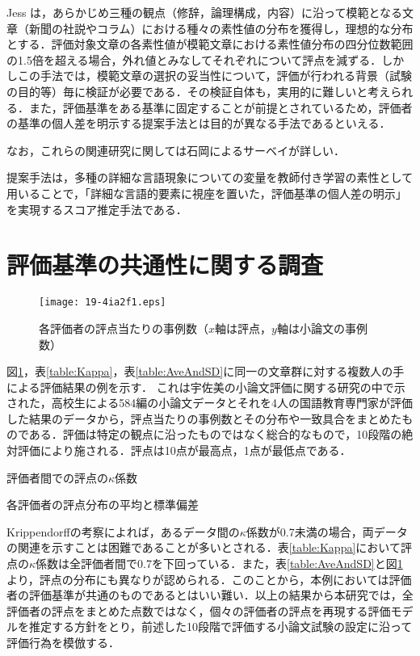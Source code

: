 \documentclass[japanese]{jnlp_1.5}
\begin{document}
Jess \cite{IshiokaKameda2006}は，あらかじめ三種の観点（修辞，論理構成，内容）に沿って模範となる文章（新聞の社説やコラム）における種々の素性値の分布を獲得し，理想的な分布とする．評価対象文章の各素性値が模範文章における素性値分布の四分位数範囲の1.5倍を超える場合，外れ値とみなしてそれぞれについて評点を減ずる．しかしこの手法では，模範文章の選択の妥当性について，評価が行われる背景（試験の目的等）毎に検証が必要である．その検証自体も，実用的に難しいと考えられる．また，評価基準をある基準に固定することが前提とされているため，評価者の基準の個人差を明示する提案手法とは目的が異なる手法であるといえる．

なお，これらの関連研究に関しては石岡によるサーベイ\cite{Ishioka2008a}が詳しい．

提案手法は，多種の詳細な言語現象についての変量を教師付き学習の素性として用いることで，「詳細な言語的要素に視座を置いた，評価基準の個人差の明示」を実現するスコア推定手法である．



\section{評価基準の共通性に関する調査}

\begin{figure}[b]
	\begin{center}
	\texttt{[image: 19-4ia2f1.eps]}
	\end{center}
	\caption{各評価者の評点当たりの事例数（$x$軸は評点，$y$軸は小論文の事例数）}
	\label{fig:1}
\end{figure}

図\ref{fig:1}，表\ref{table:Kappa}，表\ref{table:AveAndSD}に同一の文章群に対する複数人の手による評価結果の例を示す．
これは宇佐美の小論文評価に関する研究\cite{Usami2011}の中で示された，高校生による584編の小論文データとそれを4人の国語教育専門家が評価した結果のデータから，評点当たりの事例数とその分布や一致具合をまとめたものである．評価は特定の観点に沿ったものではなく総合的なもので，10段階の絶対評価により施される．評点は10点が最高点，1点が最低点である．

\begin{table}[t]
\caption{評価者間での評点の$\kappa$係数}
\label{table:Kappa}

\end{table}
\begin{table}[t]
\caption{各評価者の評点分布の平均と標準偏差}
\label{table:AveAndSD}

\end{table}

Krippendorffの考察\cite{Krippendorff1980}によれば，あるデータ間の$\kappa$係数が0.7未満の場合，両データの関連を示すことは困難であることが多いとされる．表\ref{table:Kappa}において評点の$\kappa$係数は全評価者間で0.7を下回っている．また，表\ref{table:AveAndSD}と図\ref{fig:1}より，評点の分布にも異なりが認められる．このことから，本例においては評価者の評価基準が共通のものであるとはいい難い．以上の結果から本研究では，全評価者の評点をまとめた点数ではなく，個々の評価者の評点を再現する評価モデルを推定する方針をとり，前述した10段階で評価する小論文試験の設定に沿って評価行為を模倣する．
\end{document}
